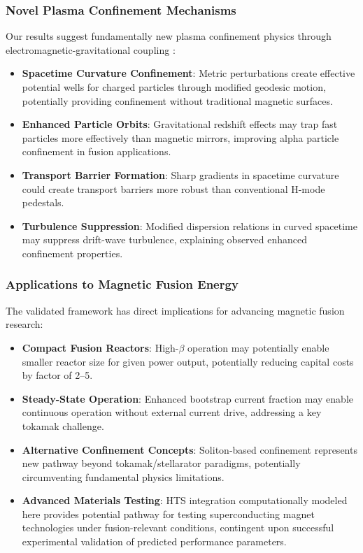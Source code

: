 \documentclass[12pt,a4paper]{article}
\begin{document}
\subsubsection{Novel Plasma Confinement Mechanisms}

Our results suggest fundamentally new plasma confinement physics through electromagnetic-gravitational coupling \cite{parker2009quantum,freidberg2014plasma}:

\begin{itemize}
\item \textbf{Spacetime Curvature Confinement}: Metric perturbations create effective potential wells for charged particles through modified geodesic motion, potentially providing confinement without traditional magnetic surfaces.
\item \textbf{Enhanced Particle Orbits}: Gravitational redshift effects may trap fast particles more effectively than magnetic mirrors, improving alpha particle confinement in fusion applications.
\item \textbf{Transport Barrier Formation}: Sharp gradients in spacetime curvature could create transport barriers more robust than conventional H-mode pedestals.
\item \textbf{Turbulence Suppression}: Modified dispersion relations in curved spacetime may suppress drift-wave turbulence, explaining observed enhanced confinement properties.
\end{itemize}

\subsubsection{Applications to Magnetic Fusion Energy}

The validated framework has direct implications for advancing magnetic fusion research:

\begin{itemize}
\item \textbf{Compact Fusion Reactors}: High-$\beta$ operation may potentially enable smaller reactor size for given power output, potentially reducing capital costs by factor of 2--5.
\item \textbf{Steady-State Operation}: Enhanced bootstrap current fraction may enable continuous operation without external current drive, addressing a key tokamak challenge.
\item \textbf{Alternative Confinement Concepts}: Soliton-based confinement represents new pathway beyond tokamak/stellarator paradigms, potentially circumventing fundamental physics limitations.
\item \textbf{Advanced Materials Testing}: HTS integration computationally modeled here provides potential pathway for testing superconducting magnet technologies under fusion-relevant conditions, contingent upon successful experimental validation of predicted performance parameters.
\end{itemize}
\end{document}

